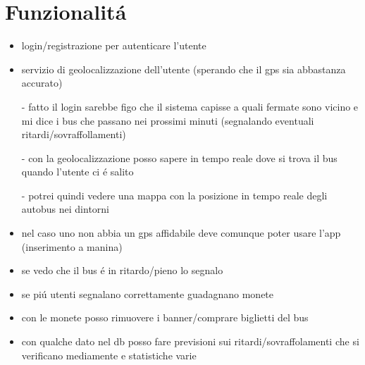 \chapter{Funzionalit\'a}
\begin{itemize}
	\item login/registrazione per autenticare l'utente\\
	\item servizio di geolocalizzazione dell'utente (sperando che il gps sia abbastanza accurato)\\
		\item [-] fatto il login sarebbe figo che il sistema capisse a quali fermate sono vicino e mi dice i bus che 
			passano nei prossimi minuti (segnalando eventuali ritardi/sovraffollamenti)\\
		\item [-] con la geolocalizzazione posso sapere in tempo reale dove si trova il bus quando l'utente ci \'e salito\\
		\item [-] potrei quindi vedere una mappa con la posizione in tempo reale degli autobus nei dintorni\\
	\item nel caso uno non abbia un gps affidabile deve comunque poter usare l'app (inserimento a manina)\\
	\item se vedo che il bus \'e in ritardo/pieno lo segnalo\\
	\item se pi\'u utenti segnalano correttamente guadagnano monete\\
	\item con le monete posso rimuovere i banner/comprare biglietti del bus\\
	\item con qualche dato nel db posso fare previsioni sui ritardi/sovraffolamenti che si verificano mediamente e statistiche varie\\
\end{itemize}

	
